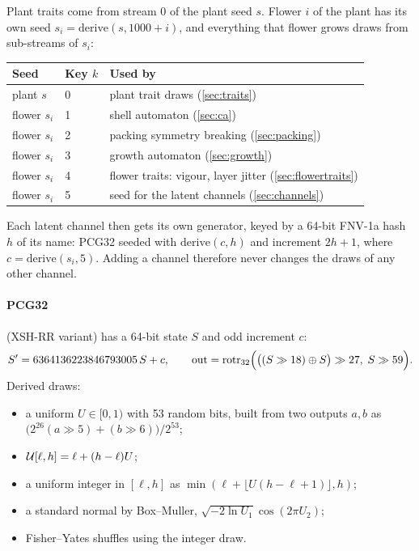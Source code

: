 Plant traits come from stream 0 of the plant seed $s$. Flower $i$ of the plant
has its own seed $s_i = \mathrm{derive}(s, 1000 + i)$, and everything that
flower grows draws from sub-streams of $s_i$:
\begin{center}\small
\begin{tabular}{@{}lll@{}}
\toprule
Seed & Key $k$ & Used by \\
\midrule
plant $s$ & 0 & plant trait draws (\cref{sec:traits}) \\
flower $s_i$ & 1 & shell automaton (\cref{sec:ca}) \\
flower $s_i$ & 2 & packing symmetry breaking (\cref{sec:packing}) \\
flower $s_i$ & 3 & growth automaton (\cref{sec:growth}) \\
flower $s_i$ & 4 & flower traits: vigour, layer jitter (\cref{sec:flowertraits}) \\
flower $s_i$ & 5 & seed for the latent channels (\cref{sec:channels}) \\
\bottomrule
\end{tabular}
\end{center}
Each latent channel then gets its own generator, keyed by a 64-bit FNV-1a hash
$h$ of its name: PCG32 seeded with $\mathrm{derive}(c, h)$ and increment
$2h+1$, where $c = \mathrm{derive}(s_i, 5)$. Adding a channel therefore never
changes the draws of any other channel.

\paragraph{PCG32} (XSH-RR variant) has a 64-bit state $S$ and odd increment $c$:
\[
  S' = 6364136223846793005\,S + c, \qquad
  \text{out} = \mathrm{rotr}_{32}\Bigl(\bigl((S \gg 18) \oplus S\bigr) \gg 27,\; S \gg 59\Bigr).
\]
Derived draws:
\begin{itemize}[leftmargin=*]
\item a uniform $U\in[0,1)$ with 53 random bits, built from two outputs
  $a,b$ as $\bigl(2^{26}(a\gg5) + (b\gg6)\bigr)/2^{53}$;
\item $\mathcal{U}[\ell,h] = \ell + (h-\ell)U$;
\item a uniform integer in $[\ell,h]$ as $\min(\ell + \lfloor U(h-\ell+1)\rfloor, h)$;
\item a standard normal by Box--Muller, $\sqrt{-2\ln U_1}\cos(2\pi U_2)$;
\item Fisher--Yates shuffles using the integer draw.
\end{itemize}

